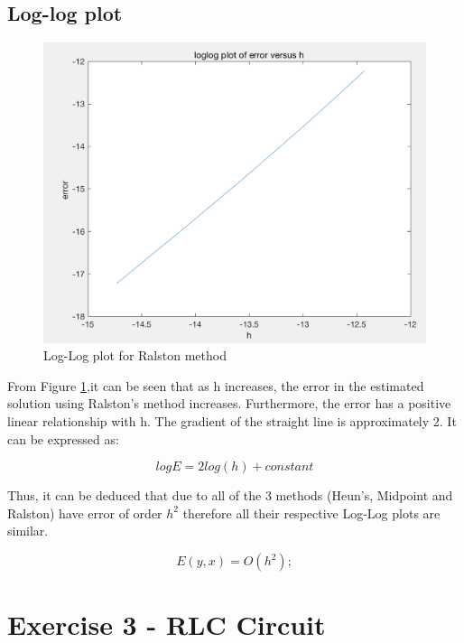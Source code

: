 \documentclass[11pt,a4paper]{article}
\begin{document}
\subsection{Log-log plot}
\begin{figure}[h]
    \centering
    \includegraphics[scale=0.5]{Ex2_Figs/errorloglogfinal1}
    \caption{Log-Log plot for Ralston method}
    \label{fig:heun_error_loglog} %
\end{figure}

From Figure \ref{fig:heun_error_loglog},it can be seen that as h increases, the error in the estimated solution using Ralston's method increases. Furthermore, the error has a positive linear relationship with h. The gradient of the straight line is approximately 2. It can be expressed as:

\begin{equation}
logE=2log(h)+constant
\end{equation}

Thus, it can be deduced that due to all of the 3 methods (Heun's, Midpoint and Ralston) have error of order $h^2$ therefore all their respective Log-Log plots are similar.

\begin{equation}
E(y,x)=O(h^2);
\end{equation}



\pagebreak
\section{Exercise 3 - RLC Circuit}\vspace{-1mm}
\end{document}

